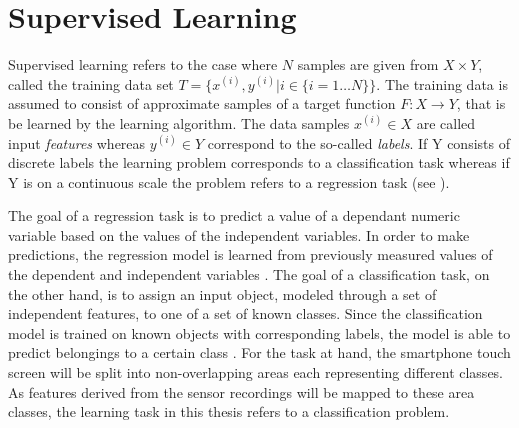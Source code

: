 \section{Supervised Learning}

Supervised learning refers to the case where $N$ samples are given from $X \times Y$, called the training data set  $T = \{ x^{(i)}, y^{(i)} | i \in \{i=1 \dots N\} \}$. The training data is assumed to consist of approximate samples of a target function $F: X \rightarrow Y$, that is be learned by the learning algorithm. The data samples $x^{(i)} \in X$ are called input \textit{features} whereas $y^{(i)} \in Y$ correspond to the so-called \textit{labels}. If Y consists of discrete labels the learning problem corresponds to a classification task whereas if Y is on a continuous scale the problem refers to a regression task (see \cite{Marsland:2009:MLA:1571643}).

The goal of a regression task is to predict a value of a dependant numeric variable based on the values of the independent variables. In order to make predictions, the regression model is learned from previously measured values of the dependent and independent variables \cite{Duda:2000:PC:954544}. The goal of a classification task, on the other hand, is to assign an input object, modeled through a set of independent features, to one of a set of known classes. Since the classification model is trained on known objects with corresponding labels, the model is able to predict belongings to a certain class \cite{Duda:2000:PC:954544}. For the task at hand, the smartphone touch screen will be split into non-overlapping areas each representing different classes. As features derived from the sensor recordings will be mapped to these area classes, the learning task in this thesis refers to a classification problem.



